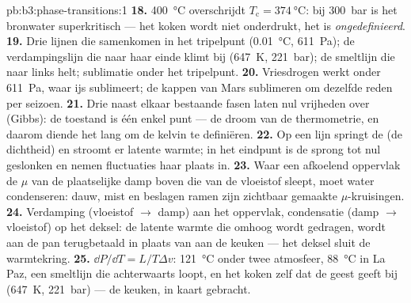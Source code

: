 \begin{solution}{pb:b3:phase-transitions:1}
\textbf{18.} \qty{400}{\celsius} overschrijdt $T_{\text{c}} =
\qty{374}{\celsius}$: bij \qty{300}{bar} is het bronwater
superkritisch --- het koken wordt niet onderdrukt, het is
\emph{ongedefinieerd}.
\textbf{19.} Drie lijnen die samenkomen in het tripelpunt
(\qty{0.01}{\celsius}, \qty{611}{Pa}); de verdampingslijn die
naar haar einde klimt bij (\qty{647}{K}, \qty{221}{bar}); de
smeltlijn die naar links helt; sublimatie onder het tripelpunt.
\textbf{20.} Vriesdrogen werkt onder \qty{611}{Pa}, waar ijs
sublimeert; de kappen van Mars sublimeren om dezelfde reden per seizoen.
\textbf{21.} Drie naast elkaar bestaande fasen laten nul vrijheden over (Gibbs):
de toestand is één enkel punt --- de droom van de thermometrie,
en daarom diende het lang om de kelvin te definiëren.
\textbf{22.} Op een lijn springt de  (de dichtheid) en
stroomt er latente warmte; in het eindpunt is de sprong tot nul geslonken
en nemen fluctuaties haar plaats in.
\textbf{23.} Waar een afkoelend oppervlak de $\mu$ van de plaatselijke damp
boven die van de vloeistof sleept, moet water condenseren: dauw, mist en
beslagen ramen zijn zichtbaar gemaakte $\mu$-kruisingen.
\textbf{24.} Verdamping (vloeistof $\to$ damp) aan het oppervlak,
condensatie (damp $\to$ vloeistof) op het deksel: de latente warmte die
omhoog wordt gedragen, wordt aan de pan terugbetaald in plaats van aan de keuken --- het
deksel sluit de warmtekring.
\textbf{25.} $\dd P/\dd T = L/T\Delta v$: \qty{121}{\celsius}
onder twee atmosfeer, \qty{88}{\celsius} in La Paz, een smeltlijn
die achterwaarts loopt, en het koken zelf dat de geest geeft bij
(\qty{647}{K}, \qty{221}{bar}) --- de keuken, in kaart gebracht.
\end{solution}
